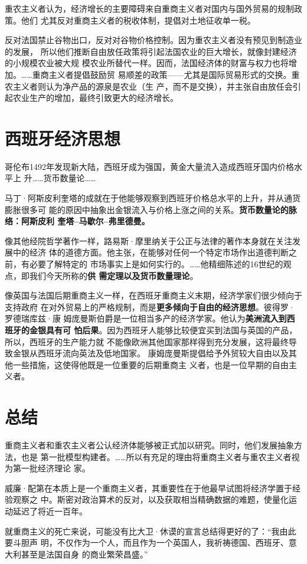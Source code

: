 重农主义者认为，经济增长的主要障碍来自重商主义者对国内与国外贸易的规制政策。他们
尤其反对重商主义者的税收体制，提倡对土地征收单一税。

反对法国禁止谷物出口，反对对谷物价格控制。因为重农主义者没有预见到制造业的发展，
所以他们推断自由放任政策将引起法国农业的巨大增长，就像封建经济的小规模农业被大规
模农业所替代一样。因而，法国经济体的财富与权力也将增加。……重商主义者提倡鼓励贸
易顺差的政策——尤其是国际贸易形式的交换。重农主义者则认为净产品的源泉是农业（生
产，而不是交换），并主张自由放任会引起农业生产的增加，最终引致更大的经济增长。

\clearpage
\section{西班牙经济思想}

哥伦布1492年发现新大陆，西班牙成为强国，黄金大量流入造成西班牙国内价格水平上
升……货币数量论……

马丁·阿斯皮利奎塔的成就在于他能够观察到西班牙价格总水平的上升，并从通货膨胀很多可
能的原因中抽象出金银流入与价格上涨之间的关系。\textbf{货币数量论的脉络：阿斯皮利
  奎塔--马歇尔--弗里德曼。}

像其他经院哲学著作一样，路易斯·摩里纳关于公正与法律的著作本身就在关注发展中的经济
体的道德方面。他主张，在能够对任何一个特定市场作出道德判断之前，有必要了解特定的
市场事实上是如何实行的。……他精细陈述的16世纪的观点，即我们今天所称的\textbf{供
  需定理以及货币数量理论}。

像英国与法国后期重商主义一样，在西班牙重商主义末期，经济学家们很少倾向于支持政府
在对外贸易上的严格规制，而是\textbf{更多倾向于自由的经济思想}。彼得罗·罗德瑞库兹·康
姆庞曼斯伯爵是一位相当多产的经济学家。他认为\textbf{美洲流入到西班牙的金银具有可
  怕后果}。因为西班牙人能够比较便宜买到法国与英国的产品，所以，西班牙的生产能力就
不能像欧洲其他国家那样得到充分发展，这将最终导致金银从西班牙流向英法及低地国家。
康姆庞曼斯提倡给予外贸较大自由以及其他一些措施，这使得他既是一位重要的后期重商主
义者，也是一位早期的自由主义者。

\section{总结}

重商主义者和重农主义者公认经济体能够被正式加以研究。同时，他们发展抽象方法，也是
第一批模型构建者。……所以有充足的理由将重商主义者与重农主义者视为第一批经济理论
家。

威廉·配第在本质上是一个重商主义者，其重要性在于他最早试图将经济学置于经验观察之
中。斯密对政治算术的反对，以及获取相当精确数据的难题，使量化运动延迟了将近一百年。

就重商主义的死亡来说，可能没有比大卫·休谟的宣言总结得更好的了：“我由此要斗胆声
明，不仅作为一个人，而且作为一个英国人，我祈祷德国、西班牙、意大利甚至是法国自身
的商业繁荣昌盛。”
